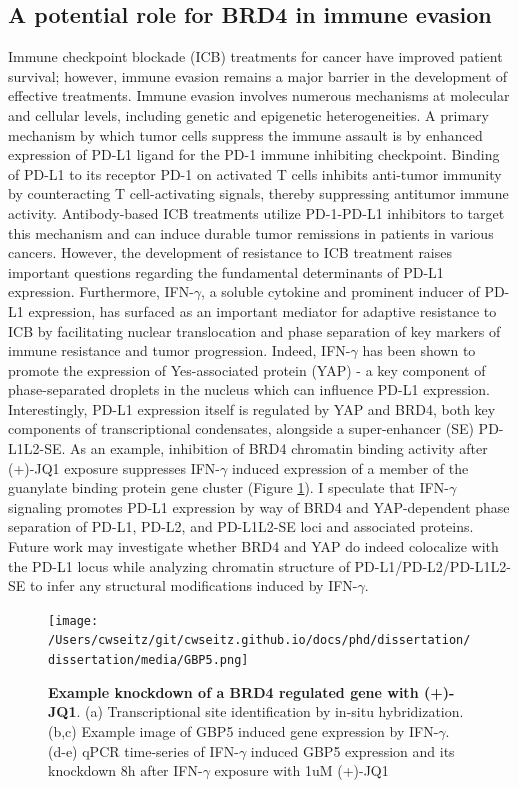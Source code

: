 \subsection{A potential role for BRD4 in immune evasion}

Immune checkpoint blockade (ICB) treatments for cancer have improved patient survival; however, immune evasion remains a major barrier in the development of effective treatments. Immune evasion involves numerous mechanisms at molecular and cellular levels, including genetic and epigenetic heterogeneities. A primary mechanism by which tumor cells suppress the immune assault is by enhanced expression of PD-L1 ligand for the PD-1 immune inhibiting checkpoint. Binding of PD-L1 to its receptor PD-1 on activated T cells inhibits anti-tumor immunity by counteracting T cell-activating signals, thereby suppressing antitumor immune activity. Antibody-based ICB treatments utilize PD-1-PD-L1 inhibitors to target this mechanism and can induce durable tumor remissions in patients in various cancers. However, the development of resistance to ICB treatment raises important questions regarding the fundamental determinants of PD-L1 expression. Furthermore, IFN-$\gamma$, a soluble cytokine and prominent inducer of PD-L1 expression, has surfaced as an important mediator for adaptive resistance to ICB by facilitating nuclear translocation and phase separation of key markers of immune resistance and tumor progression. Indeed, IFN-$\gamma$ has been shown to promote the expression of Yes-associated protein (YAP) - a key component of phase-separated droplets in the nucleus which can influence PD-L1 expression. Interestingly, PD-L1 expression itself is regulated by YAP and BRD4, both key components of transcriptional condensates, alongside a super-enhancer (SE) PD-L1L2-SE. As an example, inhibition of BRD4 chromatin binding activity after (+)-JQ1 exposure suppresses IFN-$\gamma$ induced expression of a member of the guanylate binding protein gene cluster (Figure \ref{fig:fig31}). I speculate that IFN-$\gamma$ signaling promotes PD-L1 expression by way of BRD4 and YAP-dependent phase separation of PD-L1, PD-L2, and PD-L1L2-SE loci and associated proteins. Future work may investigate whether BRD4 and YAP do indeed colocalize with the PD-L1 locus while analyzing chromatin structure of PD-L1/PD-L2/PD-L1L2-SE to infer any structural modifications induced by IFN-$\gamma$. 

\begin{figure}[t]
\texttt{[image: /Users/cwseitz/git/cwseitz.github.io/docs/phd/dissertation/dissertation/media/GBP5.png]}
\caption{\textbf{Example knockdown of a BRD4 regulated gene with (+)-JQ1}. (a) Transcriptional site identification by in-situ hybridization. (b,c) Example image of GBP5 induced gene expression by IFN-$\gamma$. (d-e) qPCR time-series of IFN-$\gamma$ induced GBP5 expression and its knockdown 8h after IFN-$\gamma$ exposure with 1uM (+)-JQ1}
\label{fig:fig31}
\end{figure}

